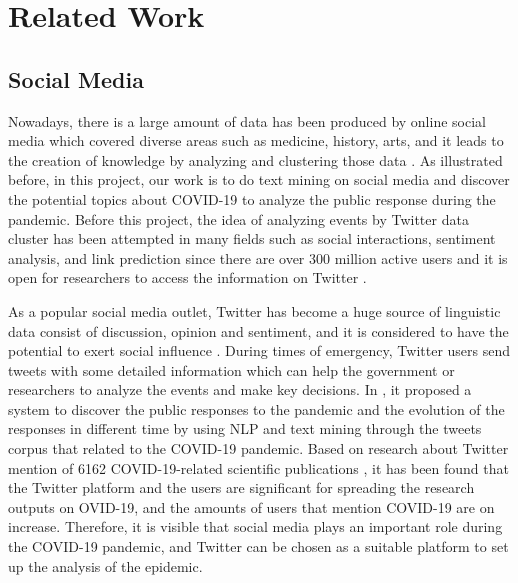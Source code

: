 \chapter{Related Work}
\label{ch:related_work} 

\section{Social Media}
Nowadays, there is a large amount of data has been produced by online social media which covered diverse areas such as medicine, history, arts, and it leads to the creation of knowledge by analyzing and clustering those data \cite{jahanbin2020using}. As illustrated before, in this project, our work is to do text mining on social media and discover the potential topics about COVID-19 to analyze the public response during the pandemic. Before this project, the idea of analyzing events by Twitter data cluster has been attempted in many fields such as social interactions, sentiment analysis, and link prediction since there are over 300 million active users and it is open for researchers to access the information on Twitter \cite{martinvcic2017link}. 

As a popular social media outlet, Twitter has become a huge source of linguistic data consist of discussion, opinion and sentiment, and it is considered to have the potential to exert social influence \cite{clark2016sifting}. During times of emergency, Twitter users send tweets with some detailed information which can help the government or researchers to analyze the events and make key decisions\cite{corvey2010twitter}. In \cite{lopez2020understanding}, it proposed a system to discover the public responses to the pandemic and the evolution of the responses in different time by using NLP and text mining through the tweets corpus that related to the COVID-19 pandemic. Based on research about Twitter mention of 6162 COVID-19-related scientific publications \cite{fang2020tracking}, it has been found that the Twitter platform and the users are significant for spreading the research outputs on OVID-19, and the amounts of users that mention COVID-19 are on increase. Therefore, it is visible that social media plays an important role during the COVID-19 pandemic, and Twitter can be chosen as a suitable platform to set up the analysis of the epidemic.



